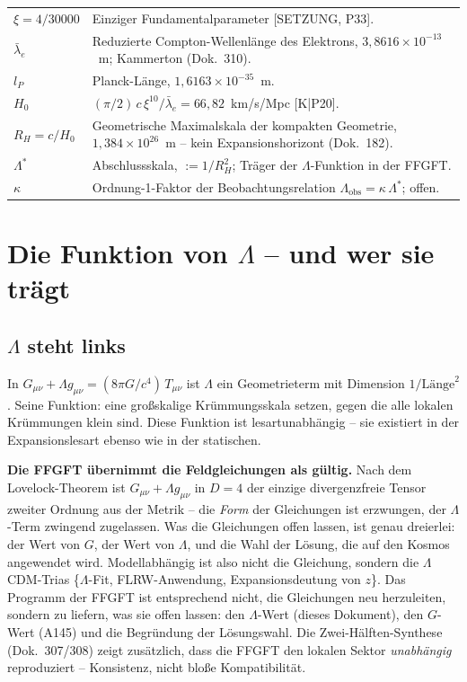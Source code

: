 \medskip
\begin{tabular}{@{}lp{10.5cm}}
$\xi = 4/30000$ & Einziger Fundamentalparameter [SETZUNG, P33]. \\[4pt]
$\bar\lambda_e$ & Reduzierte Compton-Wellenlänge des Elektrons,
                  $3{,}8616\times10^{-13}$~m; Kammerton (Dok.~310). \\[4pt]
$l_P$           & Planck-Länge, $1{,}6163\times10^{-35}$~m. \\[4pt]
$H_0$           & $(\pi/2)\,c\,\xi^{10}/\bar\lambda_e
                   = 66{,}82$~km/s/Mpc [K|P20]. \\[4pt]
$R_H = c/H_0$   & Geometrische Maximalskala der kompakten Geometrie,
                  $1{,}384\times10^{26}$~m -- kein Expansionshorizont
                  (Dok.~182). \\[4pt]
$\Lambda^{*}$   & Abschlussskala, $:= 1/R_H^2$; Träger der
                  $\Lambda$-Funktion in der FFGFT. \\[4pt]
$\kappa$        & Ordnung-1-Faktor der Beobachtungsrelation
                  $\Lambda_\text{obs} = \kappa\,\Lambda^{*}$; offen. \\
\end{tabular}

\chapter{Die Funktion von $\Lambda$ -- und wer sie trägt}
\label{ch:funktion}

\section{$\Lambda$ steht links}
\label{sec:links}

In $G_{\mu\nu} + \Lambda g_{\mu\nu} = (8\pi G/c^4)\,T_{\mu\nu}$ ist
$\Lambda$ ein Geometrieterm mit Dimension $1/\text{Länge}^2$. Seine
Funktion: eine großskalige Krümmungsskala setzen, gegen die alle
lokalen Krümmungen klein sind. Diese Funktion ist lesartunabhängig --
sie existiert in der Expansionslesart ebenso wie in der statischen.

\textbf{Die FFGFT übernimmt die Feldgleichungen als gültig.} Nach dem
Lovelock-Theorem ist $G_{\mu\nu} + \Lambda g_{\mu\nu}$ in $D=4$ der
einzige divergenzfreie Tensor zweiter Ordnung aus der Metrik -- die
\emph{Form} der Gleichungen ist erzwungen, der $\Lambda$-Term
zwingend zugelassen. Was die Gleichungen offen lassen, ist genau
dreierlei: der Wert von $G$, der Wert von $\Lambda$, und die Wahl
der Lösung, die auf den Kosmos angewendet wird. Modellabhängig ist
also nicht die Gleichung, sondern die $\Lambda$CDM-Trias
\{$\Lambda$-Fit, FLRW-Anwendung, Expansionsdeutung von $z$\}.
Das Programm der FFGFT ist entsprechend nicht, die Gleichungen neu
herzuleiten, sondern zu liefern, was sie offen lassen: den
$\Lambda$-Wert (dieses Dokument), den $G$-Wert (A145) und die
Begründung der Lösungswahl. Die Zwei-Hälften-Synthese
(Dok.~307/308) zeigt zusätzlich, dass die FFGFT den lokalen Sektor
\emph{unabhängig} reproduziert -- Konsistenz, nicht bloße
Kompatibilität.

